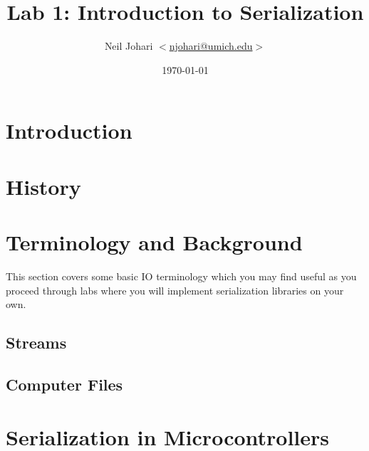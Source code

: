 \documentclass[12pt, letterpaper]{article}
\title{Lab 1: Introduction to Serialization}
\author{Neil Johari $<$\href{mailto:njohari@umich.edu}
       {njohari@umich.edu}$>$}
\date{\today}
\begin{document}
\maketitle

\section{Introduction}


\section{History}


\section{Terminology and Background}
This section covers some basic IO terminology which you may find useful as you proceed through labs where you will implement serialization libraries on your own.

\subsection{Streams}


\subsection{Computer Files}


\section{Serialization in Microcontrollers}




\end{document}
